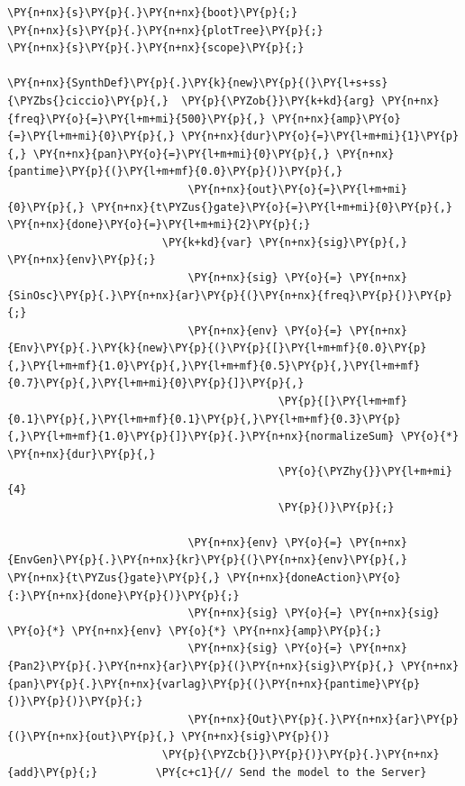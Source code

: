     \begin{tcolorbox}[breakable, size=fbox, boxrule=1pt, pad at break*=1mm,colback=cellbackground, colframe=cellborder]
\begin{Verbatim}[commandchars=\\\{\}]
\PY{n+nx}{s}\PY{p}{.}\PY{n+nx}{boot}\PY{p}{;}
\PY{n+nx}{s}\PY{p}{.}\PY{n+nx}{plotTree}\PY{p}{;}
\PY{n+nx}{s}\PY{p}{.}\PY{n+nx}{scope}\PY{p}{;}

\PY{n+nx}{SynthDef}\PY{p}{.}\PY{k}{new}\PY{p}{(}\PY{l+s+ss}{\PYZbs{}ciccio}\PY{p}{,}  \PY{p}{\PYZob{}}\PY{k+kd}{arg} \PY{n+nx}{freq}\PY{o}{=}\PY{l+m+mi}{500}\PY{p}{,} \PY{n+nx}{amp}\PY{o}{=}\PY{l+m+mi}{0}\PY{p}{,} \PY{n+nx}{dur}\PY{o}{=}\PY{l+m+mi}{1}\PY{p}{,} \PY{n+nx}{pan}\PY{o}{=}\PY{l+m+mi}{0}\PY{p}{,} \PY{n+nx}{pantime}\PY{p}{(}\PY{l+m+mf}{0.0}\PY{p}{)}\PY{p}{,} 
                            \PY{n+nx}{out}\PY{o}{=}\PY{l+m+mi}{0}\PY{p}{,} \PY{n+nx}{t\PYZus{}gate}\PY{o}{=}\PY{l+m+mi}{0}\PY{p}{,} \PY{n+nx}{done}\PY{o}{=}\PY{l+m+mi}{2}\PY{p}{;}
                        \PY{k+kd}{var} \PY{n+nx}{sig}\PY{p}{,} \PY{n+nx}{env}\PY{p}{;}
                            \PY{n+nx}{sig} \PY{o}{=} \PY{n+nx}{SinOsc}\PY{p}{.}\PY{n+nx}{ar}\PY{p}{(}\PY{n+nx}{freq}\PY{p}{)}\PY{p}{;}
                            \PY{n+nx}{env} \PY{o}{=} \PY{n+nx}{Env}\PY{p}{.}\PY{k}{new}\PY{p}{(}\PY{p}{[}\PY{l+m+mf}{0.0}\PY{p}{,}\PY{l+m+mf}{1.0}\PY{p}{,}\PY{l+m+mf}{0.5}\PY{p}{,}\PY{l+m+mf}{0.7}\PY{p}{,}\PY{l+m+mi}{0}\PY{p}{]}\PY{p}{,}                
                                          \PY{p}{[}\PY{l+m+mf}{0.1}\PY{p}{,}\PY{l+m+mf}{0.1}\PY{p}{,}\PY{l+m+mf}{0.3}\PY{p}{,}\PY{l+m+mf}{1.0}\PY{p}{]}\PY{p}{.}\PY{n+nx}{normalizeSum} \PY{o}{*} \PY{n+nx}{dur}\PY{p}{,} 
                                          \PY{o}{\PYZhy{}}\PY{l+m+mi}{4}    
                                          \PY{p}{)}\PY{p}{;}

                            \PY{n+nx}{env} \PY{o}{=} \PY{n+nx}{EnvGen}\PY{p}{.}\PY{n+nx}{kr}\PY{p}{(}\PY{n+nx}{env}\PY{p}{,} \PY{n+nx}{t\PYZus{}gate}\PY{p}{,} \PY{n+nx}{doneAction}\PY{o}{:}\PY{n+nx}{done}\PY{p}{)}\PY{p}{;}
                            \PY{n+nx}{sig} \PY{o}{=} \PY{n+nx}{sig} \PY{o}{*} \PY{n+nx}{env} \PY{o}{*} \PY{n+nx}{amp}\PY{p}{;}
                            \PY{n+nx}{sig} \PY{o}{=} \PY{n+nx}{Pan2}\PY{p}{.}\PY{n+nx}{ar}\PY{p}{(}\PY{n+nx}{sig}\PY{p}{,} \PY{n+nx}{pan}\PY{p}{.}\PY{n+nx}{varlag}\PY{p}{(}\PY{n+nx}{pantime}\PY{p}{)}\PY{p}{)}\PY{p}{;}
                            \PY{n+nx}{Out}\PY{p}{.}\PY{n+nx}{ar}\PY{p}{(}\PY{n+nx}{out}\PY{p}{,} \PY{n+nx}{sig}\PY{p}{)}
                        \PY{p}{\PYZcb{}}\PY{p}{)}\PY{p}{.}\PY{n+nx}{add}\PY{p}{;}         \PY{c+c1}{// Send the model to the Server}
\end{Verbatim}
\end{tcolorbox}

